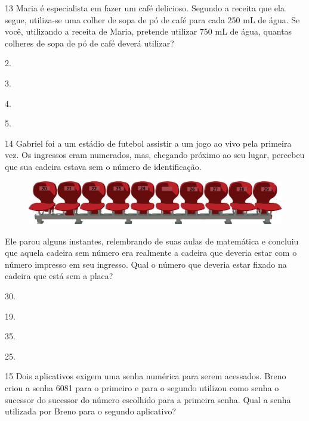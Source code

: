 \pagebreak

\num{13} Maria é especialista em fazer um café delicioso. Segundo a receita que ela segue, utiliza-se uma colher de sopa de pó de café para cada 250 mL de água. Se você, utilizando a receita de Maria, pretende utilizar 750 mL de água, quantas colheres de sopa de pó de café deverá utilizar?

\begin{escolha}
\item
  2.
\item
  3.
\item
  4.
\item
  5.
\end{escolha}

\num{14} Gabriel foi a um estádio de futebol assistir a um jogo ao vivo pela primeira vez. Os ingressos eram numerados, mas, chegando próximo ao seu
lugar, percebeu que sua cadeira estava sem o número de identificação.

\begin{figure}[htpb!]
\centering
\includegraphics[width=\textwidth]{./media/image107.png}
\end{figure}

Ele parou alguns instantes, relembrando de suas aulas de matemática e concluiu que aquela cadeira sem número era realmente a cadeira que deveria estar com o número impresso em seu ingresso. Qual o número que
deveria estar fixado na cadeira que está sem a placa?

\begin{escolha}
\item
  30.
\item
  19.
\item
  35.
\item
  25.
\end{escolha}

\pagebreak
\num{15} Dois aplicativos exigem uma senha numérica para serem acessados. Breno criou a senha 6081 para o primeiro e para o segundo utilizou como senha o sucessor do sucessor do número escolhido para a primeira senha. Qual a senha utilizada por Breno para o segundo aplicativo?

